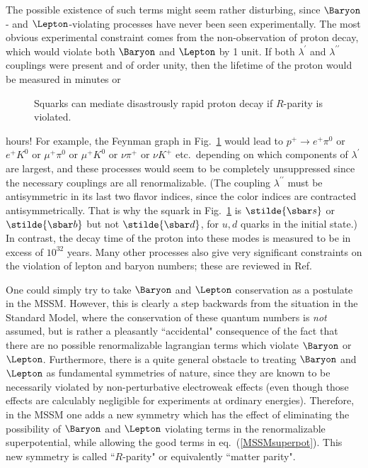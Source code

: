 The possible existence of such terms might seem rather disturbing, since
$\Baryon$- and $\Lepton$-violating processes have never been seen
experimentally.
The most obvious experimental constraint comes from the non-observation
of proton decay, which would violate both $\Baryon$ and $\Lepton$ by 1
unit.
If both $\lambda^\prime$ and $\lambda^{\prime\prime}$ couplings were
present and of order unity,
then the lifetime of the proton would be measured in minutes or
\begin{figure}
\centerline{}
\caption{Squarks can mediate disastrously rapid proton
decay if $R$-parity is violated.
\label{fig:protondecay}}
\end{figure}
hours! For example, the Feynman graph in Fig.~\ref{fig:protondecay} would
lead to $p^+
\rightarrow e^+ \pi^0$ or $e^+ K^0$ or $\mu^+ \pi^0$ or $\mu^+ K^0$
or $\nu \pi^+$
or $\nu K^+$ etc.~depending on which components of
$\lambda^{\prime}$ are largest,
and these processes would seem to be completely  unsuppressed since the
necessary couplings
are all renormalizable.
(The coupling $\lambda^{\prime\prime}$ must be antisymmetric in
its last two flavor
indices,
since the color indices are contracted antisymmetrically. That is why
the squark in Fig.~\ref{fig:protondecay} is $\stilde{\sbar s}$ or
$\stilde{\sbar b}$
but not $\stilde{\sbar d}$, for $u,d$ quarks in the initial state.)
In contrast, the decay time of the proton
into these modes is measured to be in excess of $10^{32}$ years.
Many other processes also give very significant constraints
on the
violation of lepton and baryon numbers; these are reviewed in
Ref.\cite{rparityconstraints}

One could simply try to take $\Baryon$ and $\Lepton$ conservation as a
postulate
in the MSSM. However, this is clearly a
step backwards from the situation in the Standard Model,
where the conservation of these quantum numbers is {\it not} assumed, but
is rather a pleasantly ``accidental"
consequence of the fact that there are no possible
renormalizable lagrangian terms which violate $\Baryon$ or $\Lepton$.
Furthermore, there is a quite general obstacle to treating $\Baryon$ and
$\Lepton$ as
fundamental symmetries of nature, since they are known to be
necessarily violated
by non-perturbative electroweak effects (even though those effects are
calculably negligible for experiments at ordinary energies).
Therefore, in the MSSM one adds a new symmetry which
has the effect of eliminating the possibility of $\Baryon$ and $\Lepton$
violating
terms in the renormalizable superpotential, while allowing the good
terms in eq.~(\ref{MSSMsuperpot}). This new symmetry is called
``$R$-parity" \cite{Rparity}  or equivalently
``matter parity".\cite{matterparity}

